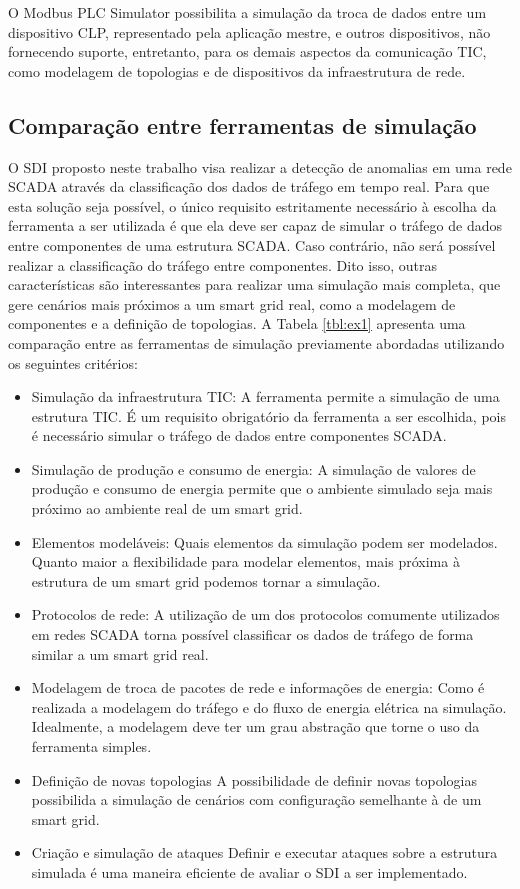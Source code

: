 \documentclass[cic,tc]{iiufrgs}
\begin{document}
O Modbus PLC Simulator possibilita a simulação da troca de dados entre um dispositivo CLP, representado pela aplicação mestre, e outros dispositivos, não fornecendo suporte, entretanto, para os demais aspectos da comunicação TIC, como modelagem de topologias e de dispositivos da infraestrutura de rede.


\subsection{Comparação entre ferramentas de simulação}

O SDI proposto neste trabalho visa realizar a detecção de anomalias em uma rede SCADA através da classificação dos dados de tráfego em tempo real. Para que esta solução seja possível, o único requisito estritamente necessário à escolha da ferramenta a ser utilizada é que ela deve ser capaz de simular o tráfego de dados entre componentes de uma estrutura SCADA. Caso contrário, não será possível realizar a classificação do tráfego entre componentes. Dito isso, outras características são interessantes para realizar uma simulação mais completa, que gere cenários mais próximos a um smart grid real, como a modelagem de componentes e a definição de topologias. A Tabela \ref{tbl:ex1} apresenta uma comparação entre as ferramentas de simulação previamente abordadas utilizando os seguintes critérios:
\begin{itemize}
\item{Simulação da infraestrutura TIC}: A ferramenta permite a simulação de uma estrutura TIC. É um requisito obrigatório da ferramenta a ser escolhida, pois é necessário simular o tráfego de dados entre componentes SCADA.
​\item{Simulação de produção e consumo de energia}: A simulação de valores de produção e consumo de energia permite que o ambiente simulado seja mais próximo ao ambiente real de um smart grid.
\item{Elementos modeláveis}: Quais elementos da simulação podem ser modelados. Quanto maior a flexibilidade para modelar elementos, mais próxima à estrutura de um smart grid podemos tornar a simulação.
​\item{Protocolos de rede}: A utilização de um dos protocolos comumente utilizados em redes SCADA torna possível classificar os dados de tráfego de forma similar a um smart grid real.
​\item{Modelagem de troca de pacotes de rede e informações de energia}: Como é realizada a modelagem do tráfego e do fluxo de energia elétrica na simulação. Idealmente, a modelagem deve ter um grau abstração que torne o uso da ferramenta simples.
​\item{Definição de novas topologias} A possibilidade de definir novas topologias possibilida a simulação de cenários com configuração semelhante à de um smart grid.
​\item{Criação e simulação de ataques} Definir e executar ataques sobre a estrutura simulada é uma maneira eficiente de avaliar o SDI a ser implementado.
\end{itemize}
\end{document}
